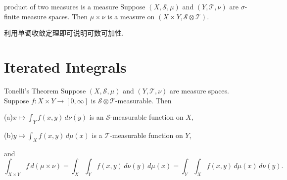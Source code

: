 \documentclass[../main.tex]{subfiles}
\begin{document}
\begin{theorem}{product of two measures is a measure}{}
Suppose \((X,\mathcal{S},\mu)\) and \((Y,\mathcal{T},\nu)\) are \(\sigma\)-finite measure spaces. Then \(\mu\times\nu\) is a measure on \((X\times Y,\mathcal{S}\otimes\mathcal{T})\).
\end{theorem}

\begin{proofsketch}
  利用单调收敛定理即可说明可数可加性.
\end{proofsketch}
\section{Iterated Integrals}

\begin{theorem}{Tonelli's Theorem}{}
Suppose \((X,\mathcal{S},\mu)\) and \((Y,\mathcal{T},\nu)\) are  measure spaces. Suppose \(f:X\times Y\to[0,\infty]\) is \(\mathcal{S}\otimes\mathcal{T}\)-measurable. Then

(a)\quad \(x\mapsto\displaystyle\int_Y f(x,y)\,d\nu(y)\) is an \(\mathcal{S}\)-measurable function on \(X\),

(b)\quad \(y\mapsto\displaystyle\int_X f(x,y)\,d\mu(x)\) is a \(\mathcal{T}\)-measurable function on \(Y\),

and
\[
\int_{X\times Y} f\,d(\mu\times\nu)
=\int_X\int_Y f(x,y)\,d\nu(y)\,d\mu(x)
=\int_Y\int_X f(x,y)\,d\mu(x)\,d\nu(y).
\]
\end{theorem}
\end{document}
